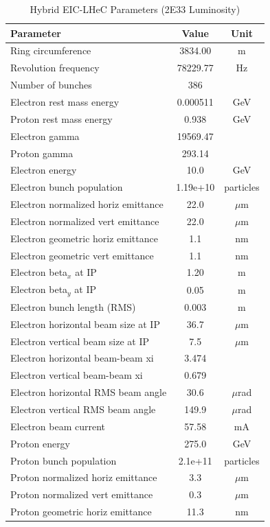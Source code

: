 \documentclass{article}
\begin{document}
\begin{longtable}{lcc}
\caption{Hybrid EIC-LHeC Parameters (2E33 Luminosity)} \\
\toprule
Parameter & Value & Unit \\
\midrule
Ring circumference & 3834.00 & m \\
Revolution frequency & 78229.77 & Hz \\
Number of bunches & 386 &  \\
Electron rest mass energy & 0.000511 & GeV \\
Proton rest mass energy & 0.938 & GeV \\
Electron gamma & 19569.47 &  \\
Proton gamma & 293.14 &  \\
Electron energy & 10.0 & GeV \\
Electron bunch population & 1.19e+10 & particles \\
Electron normalized horiz emittance & 22.0 & $\mu$m \\
Electron normalized vert emittance & 22.0 & $\mu$m \\
Electron geometric horiz emittance & 1.1 & nm \\
Electron geometric vert emittance & 1.1 & nm \\
Electron beta$_x$ at IP & 1.20 & m \\
Electron beta$_y$ at IP & 0.05 & m \\
Electron bunch length (RMS) & 0.003 & m \\
Electron horizontal beam size at IP & 36.7 & $\mu$m \\
Electron vertical beam size at IP & 7.5 & $\mu$m \\
Electron horizontal beam-beam xi & 3.474 &  \\
Electron vertical beam-beam xi & 0.679 &  \\
Electron horizontal RMS beam angle & 30.6 & $\mu$rad \\
Electron vertical RMS beam angle & 149.9 & $\mu$rad \\
Electron beam current & 57.58 & mA \\
Proton energy & 275.0 & GeV \\
Proton bunch population & 2.1e+11 & particles \\
Proton normalized horiz emittance & 3.3 & $\mu$m \\
Proton normalized vert emittance & 0.3 & $\mu$m \\
Proton geometric horiz emittance & 11.3 & nm \\

\end{longtable}
\end{document}

